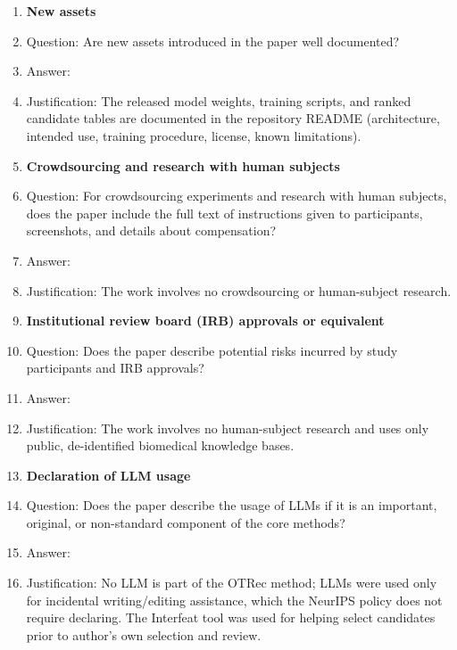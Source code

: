 \begin{enumerate}
\item {\bf New assets}
    \item[] Question: Are new assets introduced in the paper well documented?
    \item[] Answer: \answerYes{}
    \item[] Justification: The released model weights, training scripts, and ranked candidate tables are documented in the repository README (architecture, intended use, training procedure, license, known limitations).

\item {\bf Crowdsourcing and research with human subjects}
    \item[] Question: For crowdsourcing experiments and research with human subjects, does the paper include the full text of instructions given to participants, screenshots, and details about compensation?
    \item[] Answer: \answerNA{}
    \item[] Justification: The work involves no crowdsourcing or human-subject research.

\item {\bf Institutional review board (IRB) approvals or equivalent}
    \item[] Question: Does the paper describe potential risks incurred by study participants and IRB approvals?
    \item[] Answer: \answerNA{}
    \item[] Justification: The work involves no human-subject research and uses only public, de-identified biomedical knowledge bases.

\item {\bf Declaration of LLM usage}
    \item[] Question: Does the paper describe the usage of LLMs if it is an important, original, or non-standard component of the core methods?
    \item[] Answer: \answerNA{}
    \item[] Justification: No LLM is part of the OTRec method; LLMs were used only for incidental writing/editing assistance, which the NeurIPS policy does not require declaring. The Interfeat tool was used for helping select candidates prior to author's own selection and review.

\end{enumerate}
